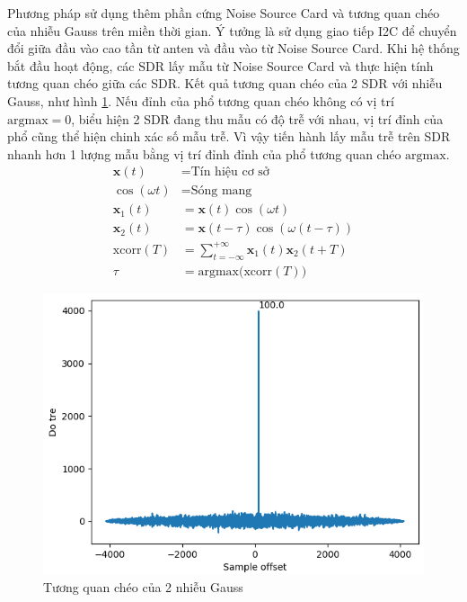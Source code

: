 {\textendash\hspace{0.1cm} Phương pháp sử dụng thêm phần cứng Noise Source Card và tương quan chéo của nhiễu Gauss \cite{kerberos} trên miền thời gian. Ý tưởng là sử dụng giao tiếp I2C để chuyển đổi giữa đầu vào cao tần từ anten và đầu vào từ Noise Source Card. Khi hệ thống bắt đầu hoạt động, các SDR lấy mẫu từ Noise Source Card và thực hiện tính tương quan chéo giữa các SDR. Kết quả tương quan chéo của 2 SDR với nhiễu Gauss, như hình \ref{fig:xcorr}. Nếu đỉnh của phổ tương quan chéo không có vị trí $\mathrm{arg max = 0}$, biểu hiện 2 SDR đang thu mẫu có độ trễ với nhau, vị trí đỉnh của phổ cũng thể hiện chinh xác số mẫu trễ. Vì vậy tiến hành lấy mẫu trễ trên SDR nhanh hơn 1 lượng mẫu bằng vị trí đỉnh đỉnh của phổ tương quan chéo $\mathrm{arg max}$.
\begin{equation}
\begin{split}
\mathbf{x}(t) &  =\textrm{Tín hiệu cơ sở}\\
\cos(\omega t) &=\textrm{Sóng mang}\\
\mathbf{x}_1(t) &=\mathbf{x}(t)\cos(\omega t)\\
\mathbf{x}_2(t) &=\mathbf{x}(t - \tau)\cos(\omega (t - \tau)) \\
\textrm{xcorr}(T) &=\sum_{t = -\infty}^{+\infty} \mathbf{x}_{1} (t) \mathbf{x}_{2} (t + T) \\
\tau &=\textrm{argmax}\textrm{(xcorr}(T)) 
\end{split}
\end{equation}

\begin{figure} [!h]
	\centering
	\includegraphics[width=0.9\linewidth]{figures/xcorr.png}
	\caption{Tương quan chéo của 2 nhiễu Gauss}
	\label{fig:xcorr}
\end{figure}

}
